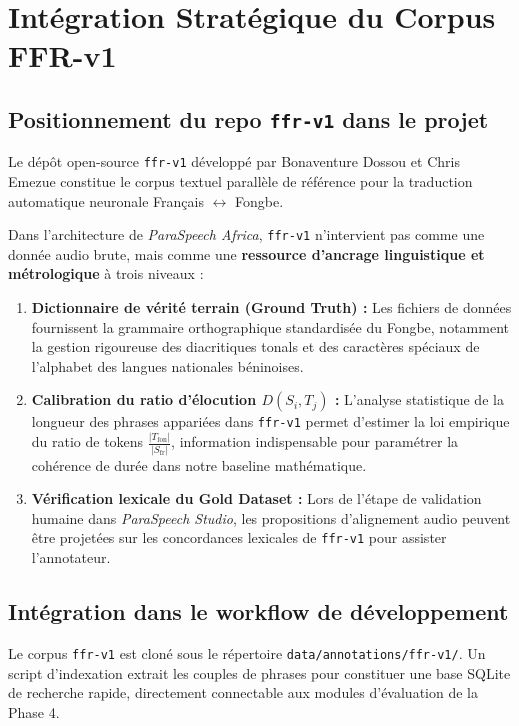 \documentclass[10pt,a4paper,twocolumn]{article}
\begin{document}
\section{Intégration Stratégique du Corpus FFR-v1}

\subsection{Positionnement du repo \texttt{ffr-v1} dans le projet}
Le dépôt open-source \texttt{ffr-v1} développé par Bonaventure Dossou et Chris Emezue constitue le corpus textuel parallèle de référence pour la traduction automatique neuronale Français $\longleftrightarrow$ Fongbe.

Dans l'architecture de \textit{ParaSpeech Africa}, \texttt{ffr-v1} n'intervient pas comme une donnée audio brute, mais comme une \textbf{ressource d'ancrage linguistique et métrologique} à trois niveaux :
\begin{enumerate}
    \item \textbf{Dictionnaire de vérité terrain (Ground Truth) :} Les fichiers de données fournissent la grammaire orthographique standardisée du Fongbe, notamment la gestion rigoureuse des diacritiques tonals et des caractères spéciaux de l'alphabet des langues nationales béninoises.
    \item \textbf{Calibration du ratio d'élocution $D(S_i, T_j)$ :} L'analyse statistique de la longueur des phrases appariées dans \texttt{ffr-v1} permet d'estimer la loi empirique du ratio de tokens $\frac{|T_{\text{fon}}|}{|S_{\text{fr}}|}$, information indispensable pour paramétrer la cohérence de durée dans notre baseline mathématique.
    \item \textbf{Vérification lexicale du Gold Dataset :} Lors de l'étape de validation humaine dans \textit{ParaSpeech Studio}, les propositions d'alignement audio peuvent être projetées sur les concordances lexicales de \texttt{ffr-v1} pour assister l'annotateur.
\end{enumerate}

\subsection{Intégration dans le workflow de développement}
Le corpus \texttt{ffr-v1} est cloné sous le répertoire \texttt{data/annotations/ffr-v1/}. Un script d'indexation extrait les couples de phrases pour constituer une base SQLite de recherche rapide, directement connectable aux modules d'évaluation de la Phase 4.
\end{document}

